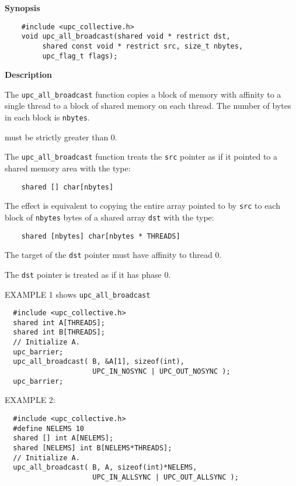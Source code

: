 {\bf Synopsis} 

\npf\vspace{-2.5em}
\begin{verbatim}
    #include <upc_collective.h>
    void upc_all_broadcast(shared void * restrict dst, 
         shared const void * restrict src, size_t nbytes, 
         upc_flag_t flags);
\end{verbatim}

{\bf Description} 

\np The {\tt upc\_all\_broadcast} function copies a block of memory with
affinity to a single thread to a block of shared memory on each thread.
The number of bytes in each block is {\tt nbytes}.

 must be strictly greater than 0.

\np The {\tt upc\_all\_broadcast} function treats the {\tt src} pointer
as if it pointed to a shared memory area with the type:

\begin{verbatim}
    shared [] char[nbytes]
\end{verbatim}  

\np The effect is equivalent to copying the entire array pointed to by
{\tt src} to each block of {\tt nbytes} bytes of a shared
array {\tt dst} with the type:

\begin{verbatim}
    shared [nbytes] char[nbytes * THREADS]
\end{verbatim}  

\np The target of the {\tt dst} pointer must have affinity to
thread 0.

\np The {\tt dst} pointer is treated as if it has phase 0.

\np EXAMPLE 1 shows {\tt upc\_all\_broadcast}
\begin{verbatim}
  #include <upc_collective.h>
  shared int A[THREADS];
  shared int B[THREADS];
  // Initialize A.
  upc_barrier;
  upc_all_broadcast( B, &A[1], sizeof(int),
                     UPC_IN_NOSYNC | UPC_OUT_NOSYNC );
  upc_barrier;
\end{verbatim}

\np EXAMPLE 2:
\begin{verbatim}
  #include <upc_collective.h>
  #define NELEMS 10
  shared [] int A[NELEMS];
  shared [NELEMS] int B[NELEMS*THREADS];
  // Initialize A.
  upc_all_broadcast( B, A, sizeof(int)*NELEMS,
                     UPC_IN_ALLSYNC | UPC_OUT_ALLSYNC );
\end{verbatim}

